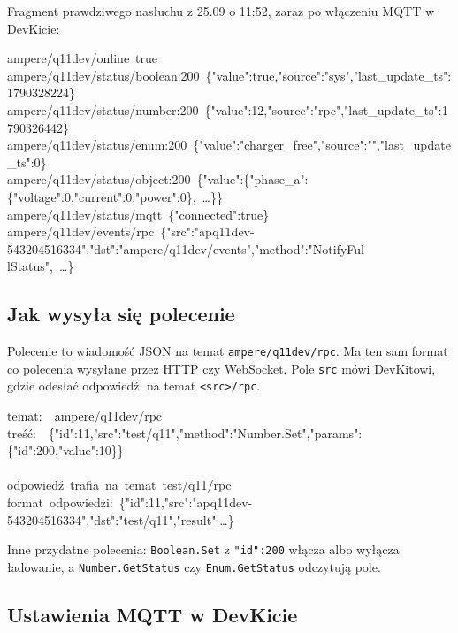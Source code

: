 \documentclass[11pt,a4paper]{article}
\begin{document}
Fragment prawdziwego nasłuchu z 25.09 o 11:52, zaraz po włączeniu MQTT w DevKicie:


\begin{kodbox}
ampere/q11dev/online\ true\\
ampere/q11dev/status/boolean:200\ \{"value":true,"source":"sys","last\_update\_ts":1790328224\}\\
ampere/q11dev/status/number:200\ \{"value":12,"source":"rpc","last\_update\_ts":1790326442\}\\
ampere/q11dev/status/enum:200\ \{"value":"charger\_free","source":"","last\_update\_ts":0\}\\
ampere/q11dev/status/object:200\ \{"value":\{"phase\_a":\{"voltage":0,"current":0,"power":0\},\ …\}\}\\
ampere/q11dev/status/mqtt\ \{"connected":true\}\\
ampere/q11dev/events/rpc\ \{"src":"apq11dev-543204516334","dst":"ampere/q11dev/events","method":"NotifyFul\\
\hspace*{1.2em}lStatus",\ …\}
\end{kodbox}

\subsection{Jak wysyła się polecenie}

Polecenie to wiadomość JSON na temat \texttt{ampere/\allowbreak{}q11dev/\allowbreak{}rpc}. Ma ten sam format co polecenia wysyłane przez HTTP czy WebSocket. Pole \texttt{src} mówi DevKitowi, gdzie odesłać odpowiedź: na temat \texttt{<src>/rpc}.


\begin{kodbox}
temat:\ \ ampere/q11dev/rpc\\
treść:\ \ \{"id":11,"src":"test/q11","method":"Number.Set","params":\{"id":200,"value":10\}\}\\
\mbox{}\\
odpowiedź\ trafia\ na\ temat\ test/q11/rpc\\
format\ odpowiedzi:\ \{"id":11,"src":"apq11dev-543204516334","dst":"test/q11","result":…\}
\end{kodbox}

Inne przydatne polecenia: \texttt{Boolean.Set} z \texttt{"id":200} włącza albo wyłącza ładowanie, a \texttt{Number.\allowbreak{}GetStatus} czy \texttt{Enum.\allowbreak{}GetStatus} odczytują pole.


\subsection{Ustawienia MQTT w DevKicie}
\end{document}
